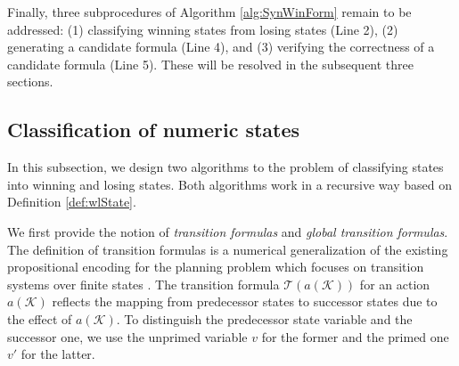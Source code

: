 \documentclass[review]{elsarticle}
\newcommand{\actparm}{\mathcal{K}}
\newcommand{\trans}{\mathcal{T}}
\begin{document}
        Finally, three  subprocedures of Algorithm \ref{alg:SynWinForm} remain to be addressed: 
        (1) classifying winning states from losing states (Line 2),
        (2) generating a candidate formula (Line 4), and 
        (3) verifying the correctness of a candidate formula (Line 5).
        These will be resolved in the subsequent three sections.
        
    \subsection{Classification of numeric states}
    In this subsection, we design two algorithms to the problem of classifying states into winning and losing states.
    Both algorithms work in a recursive way based on Definition \ref{def:wlState}.

    We first provide the notion of \textit{transition formulas} and \textit{global transition formulas}.
    The definition of transition formulas is a numerical generalization of the existing propositional encoding for the planning problem which focuses on transition systems over finite states \cite{HofB2006,Rin2012}.
    The transition formula $\trans(a(\actparm))$ for an action $a(\actparm)$ reflects the mapping from predecessor states to successor states due to the effect of $a(\actparm)$.
    To distinguish the predecessor state variable and the successor one, we use the unprimed variable $v$ for the former and the primed one $v'$ for the latter.
    
\end{document}
